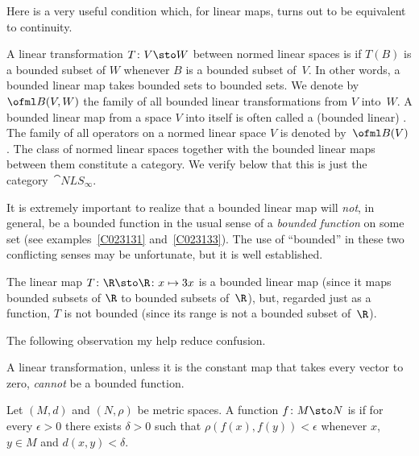 Here is a very useful condition which, for linear maps, turns out to be equivalent to continuity.

\begin{defn} A linear transformation $T\colon V \sto W$ between normed linear spaces is
 if $T(B)$ is a bounded subset of $W$ whenever $B$ is a bounded subset
of~$V$.  In other words, a bounded linear map takes bounded sets to bounded sets.  We
denote
by~$\ofml B(V,W)$ the family of all bounded linear transformations from $V$ into~$W$.  A
bounded linear map from a space $V$ into itself is often called a (bounded linear)
.  The family of all operators on a normed linear space $V$ is denoted
by~$\ofml B(V)$.  The class of normed linear spaces together with the bounded linear maps
between them constitute a category.  We verify below that this is just the
category~$\cat{NLS_{\boldsymbol\infty}}$.
\end{defn}

\begin{cau} It is extremely important to realize that a bounded linear map will \emph{not},
in general, be a bounded function in the usual sense of a \emph{bounded function} on some set
(see examples~\ref{C023131} and~\ref{C023133}).  The use of ``bounded'' in these two conflicting
senses may be unfortunate, but it is well established.
\end{cau}

\begin{exam} The linear map $T\colon \R \sto \R\colon x \mapsto 3x$ is a bounded linear map
(since it maps bounded subsets of $\R$ to bounded subsets of~$\R$), but, regarded just as
a function, $T$ is not bounded (since its range is not a bounded subset of~$\R$).
\end{exam}

The following observation my help reduce confusion.

\begin{prop} A linear transformation, unless it is the constant map that takes every vector to
zero, \emph{cannot} be a bounded function.
\end{prop}

\begin{defn}  Let $(M,d)$ and $(N,\rho)$ be metric spaces.  A function $f \colon M \sto N$ is
 if for every $\epsilon > 0$ there exists $\delta > 0$ such that
$\rho(f(x),f(y)) < \epsilon$ whenever  $x$, $y \in M$ and $d(x,y) < \delta$.
\end{defn}

